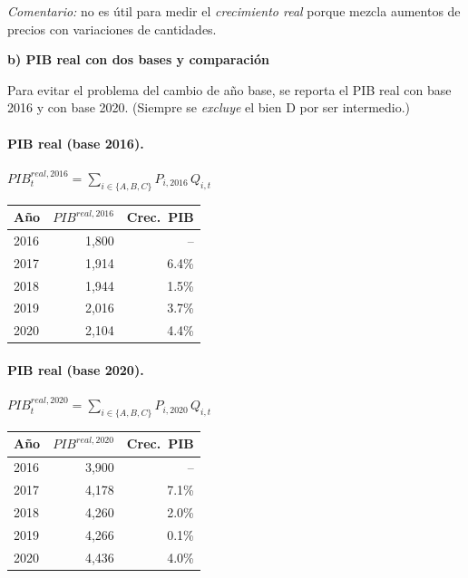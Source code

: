 \documentclass[11pt,addpoints]{article}
\begin{document}
\noindent\textit{Comentario:} no es útil para medir el \emph{crecimiento real} porque mezcla aumentos de precios con variaciones de cantidades.

\vspace{0.6em}

\textbf{b) PIB real con dos bases y comparación}

Para evitar el problema del cambio de año base, se reporta el PIB real con base 2016 y con base 2020. (Siempre se \emph{excluye} el bien D por ser intermedio.)

\paragraph{PIB real (base 2016).} $PIB^{real,2016}_t=\sum_{i\in\{A,B,C\}} P_{i,2016}\,Q_{i,t}$

\begin{center}
\begin{tabular}{lrr}
\toprule
\textbf{Año} & \textbf{$PIB^{real,2016}$} & \textbf{Crec.\ PIB} \\
\midrule
2016 & 1{,}800 & -- \\
2017 & 1{,}914 & 6.4\% \\
2018 & 1{,}944 & 1.5\% \\
2019 & 2{,}016 & 3.7\% \\
2020 & 2{,}104 & 4.4\% \\
\bottomrule
\end{tabular}
\end{center}

\paragraph{PIB real (base 2020).} $PIB^{real,2020}_t=\sum_{i\in\{A,B,C\}} P_{i,2020}\,Q_{i,t}$

\begin{center}
\begin{tabular}{lrr}
\toprule
\textbf{Año} & \textbf{$PIB^{real,2020}$} & \textbf{Crec.\ PIB} \\
\midrule
2016 & 3{,}900 & -- \\
2017 & 4{,}178 & 7.1\% \\
2018 & 4{,}260 & 2.0\% \\
2019 & 4{,}266 & 0.1\% \\
2020 & 4{,}436 & 4.0\% \\
\bottomrule
\end{tabular}
\end{center}
\end{document}
